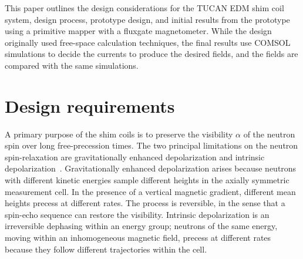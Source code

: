 \documentclass[preprint,12pt]{elsarticle}
\begin{document}
This paper outlines the design considerations for the TUCAN EDM shim
coil system, design process, prototype design, and initial results
from the prototype using a primitive mapper with a fluxgate
magnetometer.  While the design originally used free-space calculation
techniques, the final results use COMSOL simulations to decide the
currents to produce the desired fields, and the fields are compared
with the same simulations.


\section{Design requirements}\label{sec2}

A primary purpose of the shim coils is to preserve the visibility
$\alpha$ of the neutron spin over long free-precession times.  The two
principal limitations on the neutron spin-relaxation are
gravitationally enhanced depolarization and intrinsic
depolarization~\cite{bib:Abel2019}. Gravitationally enhanced
depolarization arises because neutrons with different kinetic energies
sample different heights in the axially symmetric measurement cell.
In the presence of a vertical magnetic gradient, different mean
heights precess at different rates. The process is reversible, in the
sense that a spin-echo sequence can restore the visibility.  Intrinsic
depolarization is an irreversible dephasing within an energy group;
neutrons of the same energy, moving within an inhomogeneous magnetic
field, precess at different rates because they follow different
trajectories within the cell.
\end{document}

